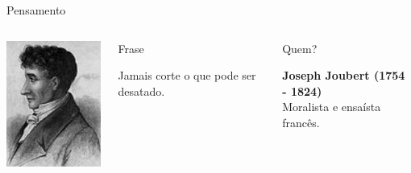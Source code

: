 \documentclass[xcolor=dvipsnames,table]{beamer}
\begin{document}
	\begin{frame}{Pensamento}
		\begin{columns}
		  		\begin{center}
		    		\includegraphics[width=.9\textwidth]{images/joubert.jpg}
		  		\end{center}
				\begin{block}{Frase}
					\begin{center}
						{\large Jamais corte o que pode ser desatado.}
					\end{center}
				\end{block}		  		
		  		\begin{block}{Quem?}
		  			\begin{center}
						{\bf Joseph Joubert (1754 - 1824)} \\Moralista e ensaísta francês.
					\end{center}
				\end{block}
		\end{columns}
	\end{frame}
    
\end{document}
